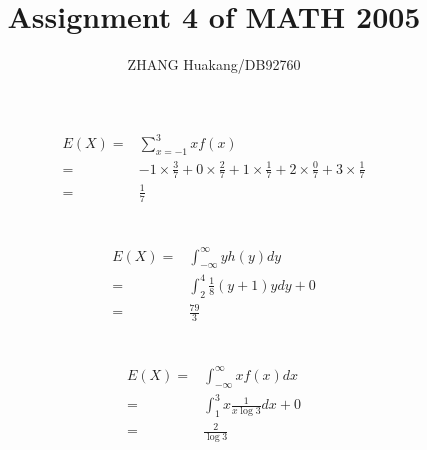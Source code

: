 \documentclass{article}
\title{Assignment 4 of MATH 2005}
\author{ZHANG Huakang/DB92760}
\begin{document}
    \maketitle

    \section{}
        \paragraph{
            \begin{equation*}
                \begin{split}
                    E(X)=&\sum _{x=-1} ^3 xf(x)\\
                        =&-1\times \frac{3}{7} +0\times \frac{2}{7}+1\times \frac{1}{7}+2\times \frac{0}{7}+3\times \frac{1}{7}\\
                        =&\frac{1}{7}
                \end{split}
            \end{equation*}
        }

    \section{}  
        \paragraph{
            \begin{equation*}
                \begin{split}
                    E(X)=&\int _{-\infty} ^\infty yh(y) dy\\
                        =&\int _ 2 ^4 \frac{1}{8} (y+1)ydy +0\\
                        =&\frac{79}{3}
                \end{split}
            \end{equation*}
        }
    
    \section{}
        \subsection{}
                \begin{equation*}
                    \begin{split}
                        E(X)=&\int _{-\infty} ^\infty xf(x) dx\\
                            =&\int _1 ^3 x\frac{1}{x \log 3} dx + 0\\
                            =&\frac{2}{\log 3}\\
                    \end{split}
                \end{equation*}
\end{document}
